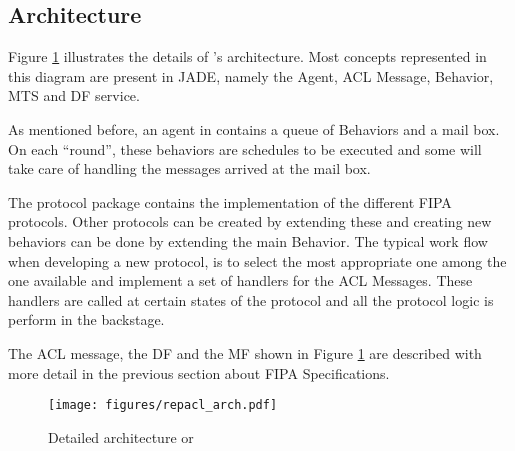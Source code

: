 \subsection{Architecture}

Figure \ref{fig:arch} illustrates the details of \apiname{}'s architecture. Most concepts represented in this diagram are present in JADE, namely the Agent, ACL Message, Behavior, MTS and DF service.

As mentioned before, an agent in \apiname{} contains a queue of Behaviors and a mail box. On each ``round'', these behaviors are schedules to be executed and some will take care of handling the messages arrived at the mail box.

The protocol package contains the implementation of the different FIPA protocols. Other protocols can be created by extending these and creating new behaviors can be done by extending the main Behavior. The typical work flow when developing a new protocol, is to select the most appropriate one among the one available and implement a set of handlers for the ACL Messages. These handlers are called at certain states of the protocol and all the protocol logic is perform in the backstage.

The ACL message, the DF and the MF shown in Figure \ref{fig:arch} are described with more detail in the previous section about FIPA Specifications.

\begin{figure}[h]
	\centering
	\texttt{[image: figures/repacl\_arch.pdf]}
	\caption{Detailed architecture or \apiname{}}
	\label{fig:arch}
\end{figure}



